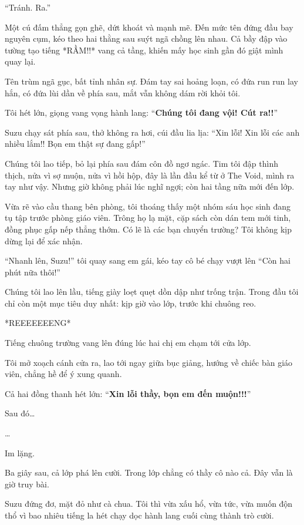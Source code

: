 \documentclass[../main.tex]{subfiles}
\begin{document}
``Tránh. Ra.''

Một cú đấm thẳng gọn ghẽ, dứt khoát và mạnh mẽ. Đến mức tên đứng đầu bay nguyên cụm, kéo theo hai thằng sau suýt ngã chồng lên nhau. Cả bầy đập vào tường tạo tiếng *RẦM!!* vang cả tầng, khiến mấy học sinh gần đó giật mình quay lại.

Tên trùm ngã gục, bất tỉnh nhân sự. Đám tay sai hoảng loạn, có đứa run run lay hắn, có đứa lùi dần về phía sau, mắt vẫn không dám rời khỏi tôi.

Tôi hét lớn, giọng vang vọng hành lang: ``\textbf{Chúng tôi đang vội! Cút ra!!}''

Suzu chạy sát phía sau, thở không ra hơi, cúi đầu lia lịa: ``Xin lỗi! Xin lỗi các anh nhiều lắm!! Bọn em thật sự đang gấp!''

Chúng tôi lao tiếp, bỏ lại phía sau đám côn đồ ngơ ngác. Tim tôi đập thình thịch, nửa vì sợ muộn, nửa vì hồi hộp, đây là lần đầu kể từ ở The Void, mình ra tay như vậy. Nhưng giờ không phải lúc nghĩ ngợi; còn hai tầng nữa mới đến lớp.

Vừa rẽ vào cầu thang bên phòng, tôi thoáng thấy một nhóm sáu học sinh đang tụ tập trước phòng giáo viên. Trông họ lạ mặt, cặp sách còn dán tem mới tinh, đồng phục gấp nếp thẳng thớm. Có lẽ là các bạn chuyển trường? Tôi không kịp dừng lại để xác nhận.

``Nhanh lên, Suzu!'' tôi quay sang em gái, kéo tay cô bé chạy vượt lên ``Còn hai phút nữa thôi!''

Chúng tôi lao lên lầu, tiếng giày loẹt quẹt dồn dập như trống trận. Trong đầu tôi chỉ còn một mục tiêu duy nhất: kịp giờ vào lớp, trước khi chuông reo.

\ct

*REEEEEEENG*

Tiếng chuông trường vang lên đúng lúc hai chị em chạm tới cửa lớp.

Tôi mở xoạch cánh cửa ra, lao tới ngay giữa bục giảng, hướng về chiếc bàn giáo viên, chẳng hề để ý xung quanh.

Cả hai đồng thanh hét lớn: ``\textbf{Xin lỗi thầy, bọn em đến muộn!!!}''

Sau đó\dots

\dots

Im lặng.

Ba giây sau, cả lớp phá lên cười. Trong lớp chẳng có thầy cô nào cả. Đây vẫn là giờ truy bài.

Suzu đứng đơ, mặt đỏ như cà chua. Tôi thì vừa xấu hổ, vừa tức, vừa muốn độn thổ vì bao nhiêu tiếng la hét chạy dọc hành lang cuối cùng thành trò cười.
\end{document}
